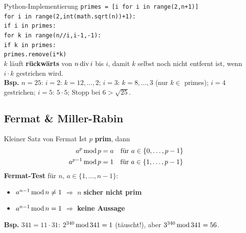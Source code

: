 \documentclass[a4paper, fontsize=7pt]{scrartcl}
\newcommand{\Div}{\mskip3mu\mathrm{div}\mskip3mu}
\newcommand{\Mod}{\mskip3mu\mathrm{mod}\mskip3mu}
\begin{document}
\begin{subbox}{Python-Implementierung}
\texttt{primes = [i for i in range(2,n+1)]}\\
\texttt{for i in range(2,int(math.sqrt(n))+1):}\\
\phantom{xx}\texttt{if i in primes:}\\
\phantom{xxxx}\texttt{for k in range(n//i,i-1,-1):}\\
\phantom{xxxxxx}\texttt{if k in primes:}\\
\phantom{xxxxxxxx}\texttt{primes.remove(i*k)}\\[2pt]
$k$ läuft \textbf{rückwärts} von $n \Div i$ bis $i$, damit $k$ selbst
noch nicht entfernt ist, wenn $i \cdot k$ gestrichen wird.\\
\textbf{Bsp.} $n = 25$: $i = 2$: $k = 12, \ldots, 2$; $i = 3$: $k = 8,
\ldots, 3$ (nur $k \in$ primes); $i = 4$ gestrichen; $i = 5$: $5 \cdot 5$;
Stopp bei $6 > \sqrt{25}$.
\end{subbox}

\subsection{Fermat \& Miller-Rabin}

\begin{mainbox}{Kleiner Satz von Fermat}
Ist $p$ \textbf{prim}, dann
\begin{align*}
a^p \Mod p &= a \quad \text{für } a \in \{0, \ldots, p - 1\}\\
a^{p-1} \Mod p &= 1 \quad \text{für } a \in \{1, \ldots, p - 1\}
\end{align*}
\textbf{Fermat-Test} für $n$, $a \in \{1, \ldots, n - 1\}$:
\begin{itemize}
    \item $a^{n-1} \Mod n \ne 1$ $\Rightarrow$ $n$ \textbf{sicher nicht prim}
    \item $a^{n-1} \Mod n = 1$ $\Rightarrow$ \textbf{keine Aussage}
\end{itemize}
\textbf{Bsp.} $341 = 11 \cdot 31$: $2^{340} \Mod 341 = 1$ (täuscht!), aber
$3^{340} \Mod 341 = 56$.
\end{mainbox}
\end{document}
